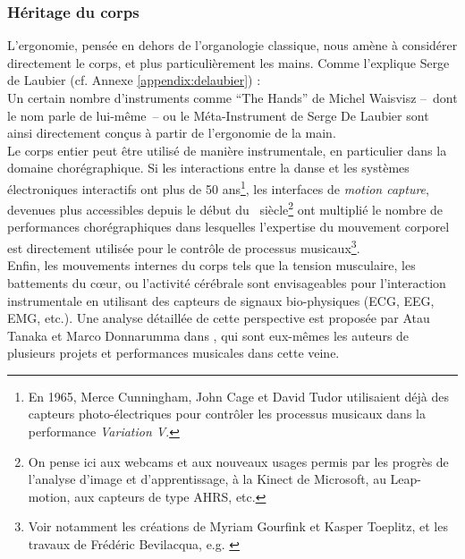 \subsubsection{Héritage du corps}

\noindent L'ergonomie, pensée en dehors de l'organologie classique, nous amène à considérer directement le corps, et plus particulièrement les mains. Comme l'explique Serge de Laubier (cf. Annexe \ref{appendix:delaubier}) :\\
 Un certain nombre d'instruments comme ``The Hands'' de Michel Waisvisz --~dont le nom parle de lui-même~-- ou le Méta-Instrument de Serge De Laubier sont ainsi directement conçus à partir de l'ergonomie de la main.\\
\indent Le corps entier peut être utilisé de manière instrumentale, en particulier dans la domaine chorégraphique. Si les interactions entre la danse et les systèmes électroniques interactifs ont plus de 50 ans\footnote{En 1965, Merce Cunningham, John Cage et David Tudor utilisaient déjà des capteurs photo-électriques pour contrôler les processus musicaux dans la performance \textit{Variation V}.}, les interfaces de \textit{motion capture}, devenues plus accessibles depuis le début du ~siècle\footnote{On pense ici aux webcams et aux nouveaux usages permis par les progrès de l'analyse d'image et d'apprentissage, à la Kinect de Microsoft, au Leap-motion, aux capteurs de type \gls{AHRS}, etc.} ont multiplié le nombre de performances chorégraphiques dans lesquelles l'expertise du mouvement corporel est directement utilisée pour le contrôle de processus musicaux\footnote{Voir notamment les créations de Myriam Gourfink et Kasper Toeplitz, et les travaux de Frédéric Bevilacqua, e.g. \cite{bevilacqua_gesture_2011}}.\\
\indent Enfin, les mouvements internes du corps tels que la tension musculaire, les battements du cœur, ou l'activité cérébrale sont envisageables pour l'interaction instrumentale en utilisant des capteurs de signaux bio-physiques (ECG, EEG, EMG, etc.). Une analyse détaillée de cette perspective est proposée par Atau Tanaka et Marco Donnarumma dans \cite{tanaka_body_2019}, qui sont eux-mêmes les auteurs de plusieurs projets et performances musicales dans cette veine.

